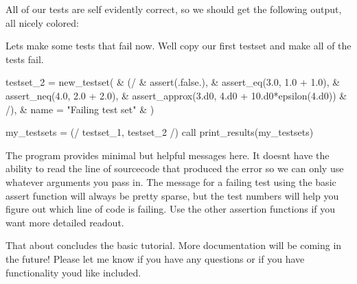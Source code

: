 All of our tests are self evidently correct, so we should get the following output, all nicely colored\+:



Lets make some tests that fail now. We\textquotesingle{}ll copy our first testset and make all of the tests fail.


\begin{DoxyCode}
testset\_2 = new\_testset(    &
  (/                        &
    assert(.false.),         &
    assert\_eq(3.0, 1.0 + 1.0),  &
    assert\_neq(4.0, 2.0 + 2.0), &
    assert\_approx(3.d0, 4.d0 + 10.d0*epsilon(4.d0)) &
  /),                       &
  name = \textcolor{stringliteral}{"Failing test set"}  &
)

my\_testsets = (/ testset\_1, testset\_2 /)
\textcolor{keyword}{call }print\_results(my\_testsets)
\end{DoxyCode}




The program provides minimal but helpful messages here. It doesn\textquotesingle{}t have the ability to read the line of sourcecode that produced the error so we can only use whatever arguments you pass in. The message for a failing test using the basic \textquotesingle{}assert\textquotesingle{} function will always be pretty sparse, but the test numbers will help you figure out which line of code is failing. Use the other assertion functions if you want more detailed readout.

That about concludes the basic tutorial. More documentation will be coming in the future! Please let me know if you have any questions or if you have functionality you\textquotesingle{}d like included. 